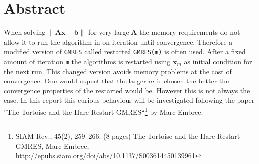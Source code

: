 \section{Abstract}
When solving $\|\mathbf{Ax} - \mathbf{b}\|$ for very large $\mathbf{A}$
the memory requirements do not allow it to run the algorithm in on iteration until convergence. Therefore a modified version of \texttt{GMRES} called restarted \texttt{GMRES(m)} is often used. After a fixed amount of iteration \texttt{m} the algorithms is restarted using $\mathbf{x}_m$ as initial condition for the next run. This changed version  avoids memory problems at the cost of convergence. One would expect that the larger $m$ is chosen the better the convergence properties of the restarted would be. However this is not always the case. In this report this curious behaviour will be investigated following the paper \textquotedblright The Tortoise and the Hare Restart GMRES\textquotedblleft  \footnote{SIAM Rev., 45(2), 259–266. (8 pages) The Tortoise and the Hare Restart GMRES, Marc Embree,
\url{http://epubs.siam.org/doi/abs/10.1137/S003614450139961}}  by Marc Embree.
